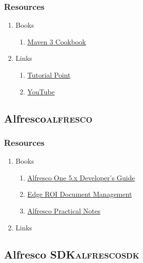 \documentclass[11pt]{article}
\begin{document}
\subsubsection{Resources}
\label{sec:orgd002838}
\begin{enumerate}
\item Books
\label{sec:org6471f3e}
\begin{enumerate}
\item \href{../notes/pdf/ApacheMaven3Cookbook.pdf::1}{Maven 3 Cookbook}
\label{sec:org976c22d}
\end{enumerate}
\item Links
\label{sec:org01a009f}
\begin{enumerate}
\item \href{https://www.tutorialspoint.com/maven/index.htm}{Tutorial Point}
\label{sec:org8076ee9}
\item \href{https://www.youtube.com/watch?v=0CFWeVgzsqY}{YouTube}
\label{sec:org391d1b2}
\end{enumerate}
\end{enumerate}
\subsection{Alfresco\hfill{}\textsc{alfresco}}
\label{sec:org4d0843e}
\subsubsection{Resources}
\label{sec:org9a96351}
\begin{enumerate}
\item Books
\label{sec:org446d397}
\begin{enumerate}
\item \href{../notes/pdf/ALFRESCO\_ONE\_5X\_DEVELOPERS\_GUIDE\_SECOND\_EDITION.pdf::23}{Alfresco One 5.x Developer's Guide}
\label{sec:org794f028}
\item \href{../notes/pdf/EdgeROIDocumentManagement.pdf::1}{Edge ROI Document Management}
\label{sec:orgc3135d3}
\item \href{../notes/pdf/ProfessionalAlfrescoPracticalSolutionsforEnterpriseContentManagement.pdf::1}{Alfresco Practical Notes}
\label{sec:org9006f92}
\end{enumerate}
\item Links
\label{sec:org9ec40f5}
\end{enumerate}
\subsection{Alfresco SDK\hfill{}\textsc{alfrescosdk}}
\label{sec:orgd4007af}
\end{document}
